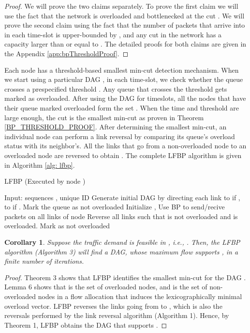 \documentclass{sig-alternate-2013}
\newtheorem{corollary}{Corollary}
\begin{document}
\begin{proof}
We will prove the two claims separately. To prove the first claim we will use the fact that the network is overloaded and bottlenecked at the cut . We will prove the second claim using the fact that the number of packets that arrive into  in each time-slot is upper-bounded by , and any cut in the network has a capacity larger than or equal to . The detailed proofs for both claims are given in the Appendix \ref{app:bpThresholdProof}.
\end{proof}


 Each node  has a threshold-based smallest min-cut detection mechanism.
When we start using a particular DAG , in each time-slot, we check whether the queue crosses a prespecified threshold . Any queue that crosses the threshold gets marked as overloaded. After using the DAG  for  timeslots, all the nodes that have their queue marked overloaded form the set . When the time  and threshold  are large enough, the cut  is the smallest min-cut as proven in Theorem \ref{BP_THRESHOLD_PROOF}. After determining the smallest min-cut, an individual node can perform a link reversal by comparing its queue's overload status with its neighbor's. All the links that go from a non-overloaded node to an overloaded node are reversed to obtain  . The complete LFBP algorithm is given in Algorithm \ref{alg: lfbp}.

\begin{algorithm}[h] 
\caption{LFBP (Executed by node )}
\label{alg: lfbp}
\begin{algorithmic}[1]
\State Input: sequences , unique ID 
\State Generate initial DAG  by directing each link  to  if , to  if .
\State Mark the queue  as not overloaded
\State Initialize , 
	\State Use BP to send/recive packets on all links of node 
	\If {}  \EndIf
	\State 
\State	
	\State 
	\If {} 
		\State Reverse all links  such that  is not overloaded and  is overloaded.
		\State 
		\State Mark  as not overloaded
	\EndIf
	
\EndWhile
\end{algorithmic}
\end{algorithm}

\begin{corollary}
Suppose the traffic demand is feasible in , i.e., . Then, the LFBP algorithm (Algorithm 3) will find a DAG, whose maximum flow supports , in a finite number of iterations.
\end{corollary}
\begin{proof}
Theorem 3 shows that LFBP identifies the smallest min-cut  for the DAG . Lemma 6 shows that  is the set of overloaded nodes, and  is the set of non-overloaded nodes in a flow allocation that induces the lexicographically minimal overload vector. LFBP reverses the links going from  to , which is also the reversals performed by the link reversal algorithm (Algorithm 1). Hence, by Theorem 1, LFBP obtains the DAG that supports .
\end{proof}
\end{document}
